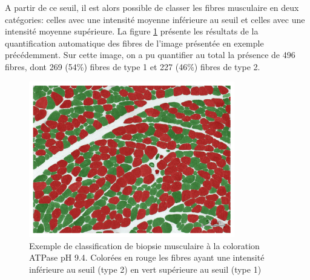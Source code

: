 A partir de ce seuil, il est alors possible de classer les fibres musculaire en deux catégories: celles avec une intensité moyenne inférieure au seuil et celles avec une intensité moyenne supérieure. La figure \ref{fig:apt_paint} présente les résultats de la quantification automatique des fibres de l'image présentée en exemple précédemment. Sur cette image, on a pu quantifier au total la présence de 496 fibres, dont 269 (54\%) fibres de type 1 et 227 (46\%) fibres de type 2. 
\begin{figure}[htbp]
 \centering
 \includegraphics[width=0.8\textwidth]{figures/atp_paint.png}
 \caption[Exemple de classification de biopsie musculaire à la coloration ATPase pH 9.4]{Exemple de classification de biopsie musculaire à la coloration ATPase pH 9.4. Colorées en rouge les fibres ayant une intensité inférieure au seuil (type 2) en vert supérieure au seuil (type 1)}
 \label{fig:apt_paint}
\end{figure}


